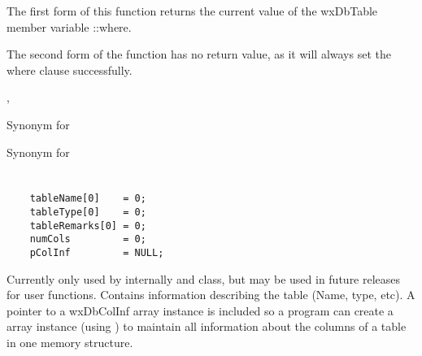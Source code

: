 


The first form of this function returns the current value of the wxDbTable
member variable ::where.

The second form of the function has no return value, as it will always set
the where clause successfully.


,

\label{wxdbtableplusplus}


Synonym for 



\label{wxdbtableminusminus}


Synonym for 



\section{}\label{wxdbtableinf}

\begin{verbatim}
    tableName[0]    = 0;
    tableType[0]    = 0;
    tableRemarks[0] = 0;
    numCols         = 0;
    pColInf         = NULL;
\end{verbatim}

Currently only used by  internally
and  class, but may be used in future releases for
user functions.  Contains information describing the table (Name, type, etc).
A pointer to a wxDbColInf array instance is included so a program can create a
 array instance (using
)
to maintain all information about the columns of a table in one memory
structure.

